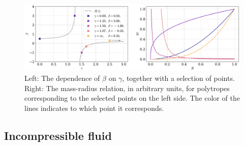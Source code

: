 \begin{figure}[h]
    \centering
    \includegraphics[width=\textwidth]{../scripts/figurer/mass_radius_relation_polytropes.pdf}
    \caption{
        Left: The dependence of $\beta$ on $\gamma$, together with a selection of points.
        Right: The mass-radius relation, in arbitrary units, for polytropes corresponding to the selected points on the left side. The color of the lines indicates to which point it corresponds.
        }
    \label{fig: mass radius relation polytropes} 
\end{figure}



\subsection{Incompressible fluid}
\label{subsection: incompressible fluid}

